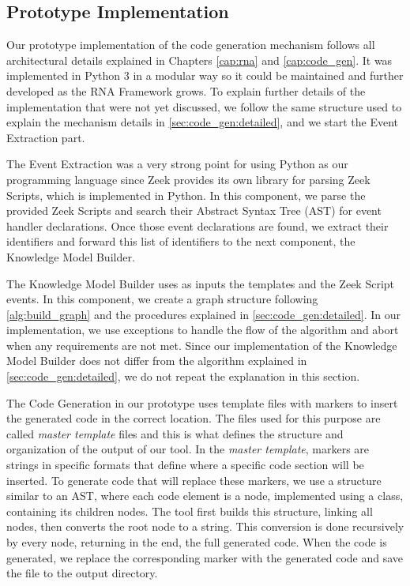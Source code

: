 \subsection{Prototype Implementation}

Our prototype implementation of the code generation mechanism follows all architectural details explained in Chapters \ref{cap:rna} and \ref{cap:code_gen}. It was implemented in Python 3 in a modular way so it could be maintained and further developed as the RNA Framework grows. To explain further details of the implementation that were not yet discussed, we follow the same structure used to explain the mechanism details in \autoref{sec:code_gen:detailed}, and we start the Event Extraction part.

The Event Extraction was a very strong point for using Python as our programming language since Zeek provides its own library for parsing Zeek Scripts, which is implemented in Python. In this component, we parse the provided Zeek Scripts and search their Abstract Syntax Tree (AST) for event handler declarations. Once those event declarations are found, we extract their identifiers and forward this list of identifiers to the next component, the Knowledge Model Builder.

The Knowledge Model Builder uses as inputs the templates and the Zeek Script events. In this component, we create a graph structure following \autoref{alg:build_graph} and the procedures explained in \autoref{sec:code_gen:detailed}. In our implementation, we use exceptions to handle the flow of the algorithm and abort when any requirements are not met. Since our implementation of the Knowledge Model Builder does not differ from the algorithm explained in \autoref{sec:code_gen:detailed}, we do not repeat the explanation in this section.

The Code Generation in our prototype uses template files with markers to insert the generated code in the correct location. The files used for this purpose are called \textit{master template} files and this is what defines the structure and organization of the output of our tool. In the \textit{master template}, markers are strings in specific formats that define where a specific code section will be inserted. To generate code that will replace these markers, we use a structure similar to an AST, where each code element is a node, implemented using a class, containing its children nodes. The tool first builds this structure, linking all nodes, then converts the root node to a string. This conversion is done recursively by every node, returning in the end, the full generated code. When the code is generated, we replace the corresponding marker with the generated code and save the file to the output directory.

